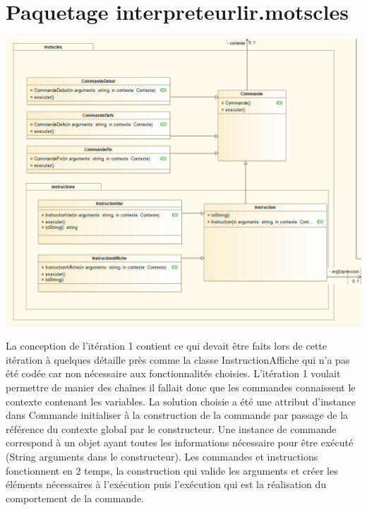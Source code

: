 \section{Paquetage interpreteurlir.motscles}
\begin{center}\includegraphics[scale=0.60]{fichiers/dossierPartieConception/img/COO/COO_prototype_1/PackageMotscles}\end{center}
\par La conception de l'itération 1 contient ce qui devait être faits lors de cette itération à quelques détaille près comme la classe InstructionAffiche qui n'a pas été codée car non nécessaire aux fonctionnalités choisies.
L'itération 1 voulait permettre de manier des chaînes il fallait donc que les commandes connaissent le contexte contenant les variables. La solution choisie a été une attribut d'instance dans Commande initialiser à la construction de la commande par passage de la référence du contexte global par le constructeur. Une instance de commande correspond à un objet ayant toutes les informations nécessaire pour être exécuté (String arguments dans le constructeur). Les commandes et instructions fonctionnent en 2 temps, la construction qui valide les arguments et créer les éléments nécessaires à l'exécution puis l'exécution qui est la réalisation du comportement de la commande.

